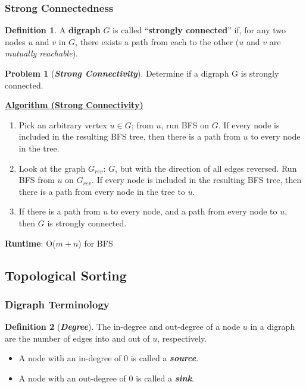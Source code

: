 \documentclass[12pt]{extarticle}
\theoremstyle{definition}
\newtheorem*{definition}{Definition}
\newtheorem*{problem}{Problem}
\theoremstyle{remark}
\newcommand{\probname}[1]{\noindent \textbf{\textit{#1}}}
\newcommand{\probtitle}[1]{\noindent \textbf{\ul{#1}}}
\begin{document}
\pagebreak
\subsubsection{Strong Connectedness}
\begin{definition}
    A \textbf{digraph} $G$ is called “\textbf{strongly connected}” if, for any two nodes $u$ and $v$ in $G$, there exists a path from each to the other ($u$ and $v$ are \textit{mutually reachable}).
\end{definition}
\begin{problem}[\probname{Strong Connectivity}]
    Determine if a digraph G is strongly connected.
\end{problem}
\begin{tcolorbox}[colback=white!90!black]
    \probtitle{Algorithm (Strong Connectivity)}
    \begin{enumerate}
        \item Pick an arbitrary vertex $u\in G$; from $u$, run BFS on $G$. If every node is included in the resulting BFS tree, then there is a path from $u$ to every node in the tree.
        \item Look at the graph $G_{rev}$: $G$, but with the direction of all edges reversed. Run BFS from $u$ on $G_{rev}$. If every node is included in the resulting BFS tree, then there is a path from every node in the tree to $u$.
        \item If there is a path from $u$ to every node, and a path from every node to $u$, then $G$ is strongly connected.
    \end{enumerate}
    \noindent\textbf{Runtime}: O($m+n$) for BFS
\end{tcolorbox}

\pagebreak
\subsection{Topological Sorting}
\subsubsection*{Digraph Terminology}
\begin{definition}[\probname{Degree}]
    The in-degree and out-degree of a node $u$ in a digraph are the number of edges into and out of $u$, respectively. \begin{itemize}
        \item A node with an in-degree of 0 is called a \textbf{\textit{source}}.
        \item A node with an out-degree of 0 is called a \textbf{\textit{sink}}.
    \end{itemize}
\end{definition}
\end{document}
